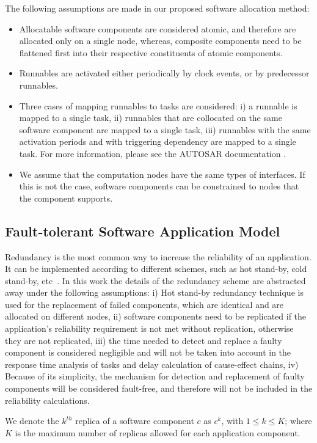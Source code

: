 The following assumptions are made in our proposed software allocation method:
\begin{itemize}
\item Allocatable software components are considered atomic, and therefore are allocated only on a single node, whereas, composite components need to be flattened first into their respective constituents of atomic components.
\item Runnables are activated either periodically by clock events, or by predecessor runnables.
\item Three cases of mapping runnables to tasks are considered: i) a runnable is mapped to a single task, ii) runnables that are collocated on the same software component are mapped to a single task, iii) runnables with the same activation periods and with triggering dependency are mapped to a single task. For more information, please see the AUTOSAR documentation \cite{AUTOSAR2017SpecificationSoftware}.
\item We assume that the computation nodes have the same types of interfaces. If this is not the case, software components can be constrained to nodes that the component supports.
\end{itemize}

\subsection{Fault-tolerant Software Application Model}
Redundancy is the most common way to increase the reliability of an application. It can be implemented according to different schemes, such as hot stand-by, cold stand-by, etc~\cite{Dubrova2013Fault-tolerantDesign}. In this work the details of the redundancy scheme are abstracted away under the following assumptions: i) Hot stand-by redundancy technique is used for the replacement of failed components, which are identical and are allocated on different nodes, ii) software components need to be replicated if the application's reliability requirement is not met without replication, otherwise they are not replicated, iii) the time needed to detect and replace a faulty component is considered negligible and will not be taken into account in the response time analysis of tasks and delay calculation of cause-effect chains, iv) Because of its simplicity, the mechanism for detection and replacement of faulty components will be considered fault-free, and therefore will not be included in the reliability calculations.

We denote the $k^{th}$ replica of a software component $c$ as $c^k$, with $1\le k\leq K$; where $K$ is the maximum number of replicas allowed for each application component.

